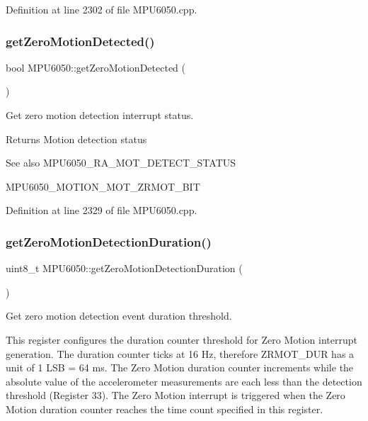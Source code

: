 Definition at line 2302 of file M\+P\+U6050.\+cpp.

\mbox{\label{classMPU6050_a384765351b5c4bd2b6efec9ed71ad1b7}} 
\subsubsection{\texorpdfstring{getZeroMotionDetected()}{getZeroMotionDetected()}}
{\footnotesize\ttfamily bool M\+P\+U6050\+::get\+Zero\+Motion\+Detected (\begin{DoxyParamCaption}{ }\end{DoxyParamCaption})}



Get zero motion detection interrupt status. 

\begin{DoxyReturn}{Returns}
Motion detection status 
\end{DoxyReturn}
\begin{DoxySeeAlso}{See also}
M\+P\+U6050\+\_\+\+R\+A\+\_\+\+M\+O\+T\+\_\+\+D\+E\+T\+E\+C\+T\+\_\+\+S\+T\+A\+T\+US 

M\+P\+U6050\+\_\+\+M\+O\+T\+I\+O\+N\+\_\+\+M\+O\+T\+\_\+\+Z\+R\+M\+O\+T\+\_\+\+B\+IT 
\end{DoxySeeAlso}


Definition at line 2329 of file M\+P\+U6050.\+cpp.

\mbox{\label{classMPU6050_a04c0fcdcd0157b6dbf74d4901424801e}} 
\subsubsection{\texorpdfstring{getZeroMotionDetectionDuration()}{getZeroMotionDetectionDuration()}}
{\footnotesize\ttfamily uint8\+\_\+t M\+P\+U6050\+::get\+Zero\+Motion\+Detection\+Duration (\begin{DoxyParamCaption}{ }\end{DoxyParamCaption})}



Get zero motion detection event duration threshold. 

This register configures the duration counter threshold for Zero Motion interrupt generation. The duration counter ticks at 16 Hz, therefore Z\+R\+M\+O\+T\+\_\+\+D\+UR has a unit of 1 L\+SB = 64 ms. The Zero Motion duration counter increments while the absolute value of the accelerometer measurements are each less than the detection threshold (Register 33). The Zero Motion interrupt is triggered when the Zero Motion duration counter reaches the time count specified in this register.

